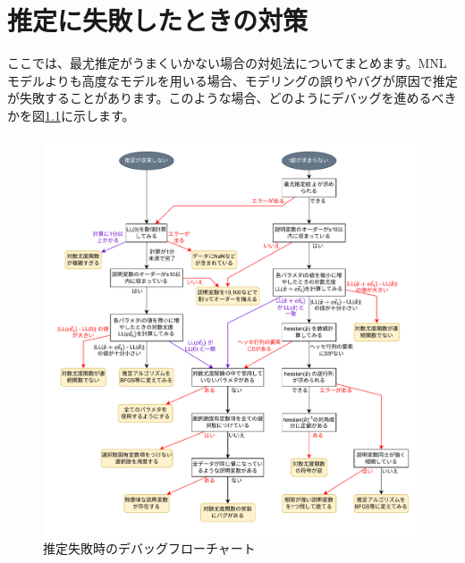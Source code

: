 \chapter{推定に失敗したときの対策}\label{failure}

ここでは、最尤推定がうまくいかない場合の対処法についてまとめます。MNLモデルよりも高度なモデルを用いる場合、モデリングの誤りやバグが原因で推定が失敗することがあります。このような場合、どのようにデバッグを進めるべきかを図\ref{fig:estimation_failure}に示します。

\begin{figure}[ht]
    \centering
    \includegraphics[width=0.95\hsize]{figure/estimation_failure.pdf}
    \caption{推定失敗時のデバッグフローチャート}
    \label{fig:estimation_failure}
\end{figure}
